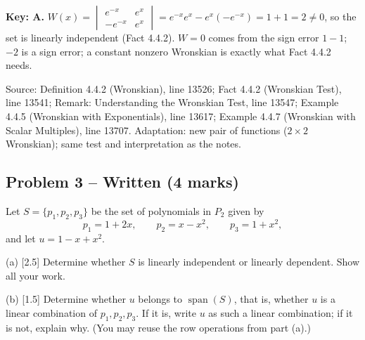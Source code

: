 \documentclass[11pt,a4paper]{article}
\newcommand{\Src}[1]{{\footnotesize\color{black!65}Source: #1}}
\begin{document}
\textbf{Key: A.} $W(x)=\begin{vmatrix}e^{-x}&e^{x}\\-e^{-x}&e^{x}\end{vmatrix}=e^{-x}e^{x}-e^{x}(-e^{-x})=1+1=2\neq0$, so the set is linearly independent (Fact 4.4.2). $W=0$ comes from the sign error $1-1$; $-2$ is a sign error; a constant nonzero Wronskian is exactly what Fact 4.4.2 needs.\par
\Src{Definition 4.4.2 (Wronskian), line 13526; Fact 4.4.2 (Wronskian Test), line 13541; Remark: Understanding the Wronskian Test, line 13547; Example 4.4.5 (Wronskian with Exponentials), line 13617; Example 4.4.7 (Wronskian with Scalar Multiples), line 13707. Adaptation: new pair of functions ($2\times2$ Wronskian); same test and interpretation as the notes.}\par
\subsection*{Problem 3 -- Written (4 marks)}
Let $S=\{p_1,p_2,p_3\}$ be the set of polynomials in $P_2$ given by\[p_1=1+2x,\qquad p_2=x-x^{2},\qquad p_3=1+x^{2},\]and let $u=1-x+x^{2}$.\par (a) [2.5] Determine whether $S$ is linearly independent or linearly dependent. Show all your work.\par (b) [1.5] Determine whether $u$ belongs to $\operatorname{span}(S)$, that is, whether $u$ is a linear combination of $p_1,p_2,p_3$. If it is, write $u$ as such a linear combination; if it is not, explain why. (You may reuse the row operations from part (a).)\par
\end{document}
